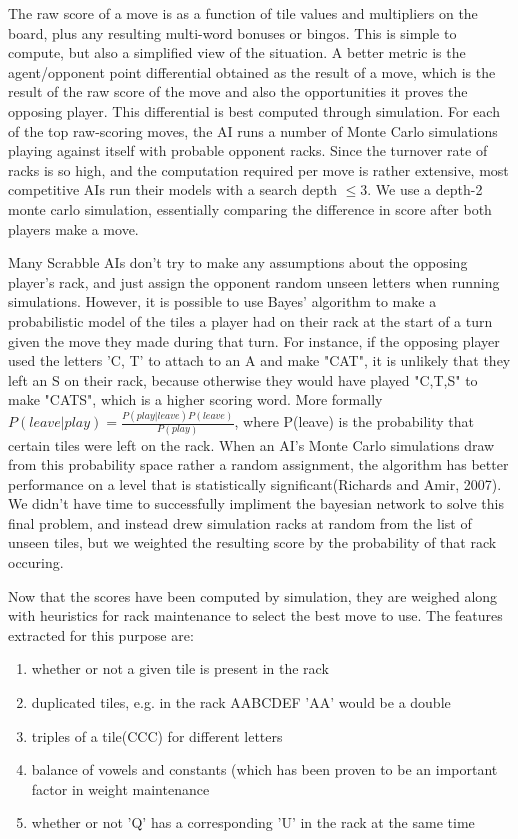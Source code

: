 \documentclass[12pt]{article}
\begin{document}
The raw score of a move is as a function of tile values and
multipliers on the board, plus any resulting multi-word bonuses or
bingos. This is simple to compute, but also a simplified view of the
situation. A better metric is the agent/opponent point differential
obtained as the result of a move, which is the result of the raw score
of the move and also the opportunities it proves the opposing
player. This differential is best computed through simulation. For
each of the top raw-scoring moves, the AI runs a number of Monte Carlo
simulations playing against itself with probable opponent racks. Since
the turnover rate of racks is so high, and the computation required
per move is rather extensive, most competitive AIs run their models
with a search depth $\leq 3$. We use a depth-2 monte carlo simulation, essentially comparing the difference in score after both players make a move. 

Many Scrabble AIs don't try to make any assumptions about the opposing
player's rack, and just assign the opponent random unseen letters when
running simulations. However, it is possible to use Bayes' algorithm
to make a probabilistic model of the tiles a player had on their rack
at the start of a turn given the move they made during that turn.%
For instance, if the opposing player used the letters 'C, T' to attach
to an A and make "CAT", it is unlikely that they left an S on their
rack, because otherwise they would have played "C,T,S" to make "CATS",
which is a higher scoring word. More formally $P(leave | play) =
\frac{P(play | leave)P(leave)}{P(play)}$, where P(leave) is the
probability that certain tiles were left on the rack. When an AI's
Monte Carlo simulations draw from this probability space rather a
random assignment, the algorithm has better performance on a level
that is statistically significant(Richards and Amir, 2007). We didn't have time to successfully impliment the bayesian network to solve this final problem, and instead drew simulation racks at random from the list of unseen tiles, but we weighted the resulting score by the probability of that rack occuring. 

	
Now that the scores have been computed by simulation, they are weighed
along with heuristics for rack maintenance to select the best move to
use. The features extracted for this purpose are:

\begin{enumerate}
  \item whether or not a given tile is present in the rack
  \item duplicated tiles, e.g. in the rack AABCDEF 'AA' would be a double
  \item triples of a tile(CCC) for different letters
  \item balance of vowels and constants (which has been proven to be
    an important factor in weight maintenance
  \item whether or not 'Q' has a corresponding 'U' in the rack at the same time
\end{enumerate}
\end{document}
